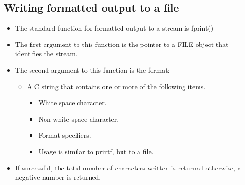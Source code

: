 \subsection{Writing formatted output to a file}
\begin{itemize}
    \item The standard function for formatted output to a stream is fprint().
    
    \item The first argument to this function is the pointer to a FILE object that identifies the stream.
    \item The second argument to this function is the format:
        \begin{itemize}
            \item A C string that contains one or more of the following items.
                \begin{itemize}
                    \item White space character.
                    \item Non-white space character.
                    \item Format specifiers.
                    \item Usage is similar to printf, but to a file.
                \end{itemize}
        \end{itemize}
    
    \item If successful, the total number of characters written is returned otherwise, a negative number is returned.
    
\end{itemize}


